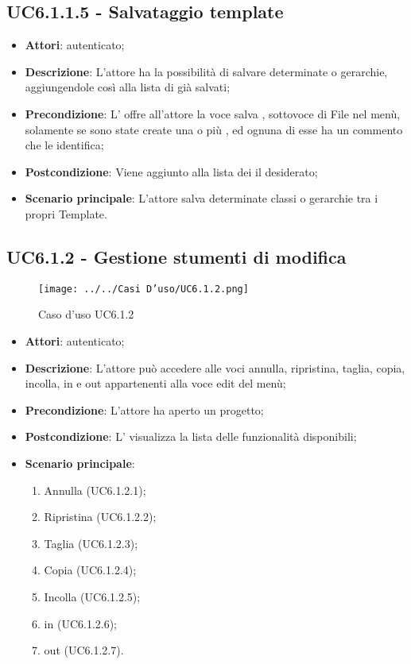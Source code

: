 \subsection{UC6.1.1.5 - Salvataggio template}
\label{ssec:UC6.1.1.5}
\begin{itemize}
\item \textbf{Attori}:  autenticato;
\item \textbf{Descrizione}: L’attore ha la possibilità di salvare determinate  o gerarchie, aggiungendole così alla lista di  già salvati;
\item \textbf{Precondizione}: L’ offre all’attore la voce salva , sottovoce di File nel menù, solamente se sono state create una o più , ed ognuna di esse ha un commento che le identifica;
\item \textbf{Postcondizione}: Viene aggiunto alla lista dei  il  desiderato;
\item \textbf{Scenario principale}: L'attore salva determinate classi o gerarchie tra i propri Template.
\end{itemize}
\newpage
\subsection{UC6.1.2 - Gestione stumenti di modifica}
\label{ssec:UC6.1.2}
\begin{figure}[h!]
\centering
\texttt{[image: ../../Casi D'uso/UC6.1.2.png]}
\caption{Caso d'uso UC6.1.2}
 \end{figure}
\begin{itemize}
\item \textbf{Attori}:  autenticato;
\item \textbf{Descrizione}: L’attore può accedere alle voci annulla, ripristina, taglia, copia, incolla,  in e  out appartenenti alla voce edit del menù;
\item \textbf{Precondizione}: L'attore ha aperto un progetto;
\item \textbf{Postcondizione}: L’ visualizza la lista delle funzionalità disponibili;
\item \textbf{Scenario principale}: \begin{enumerate}\item Annulla (UC6.1.2.1);\item Ripristina (UC6.1.2.2);\item Taglia (UC6.1.2.3);\item Copia (UC6.1.2.4);\item Incolla (UC6.1.2.5);\item {} in (UC6.1.2.6);\item {} out (UC6.1.2.7).
 \end{enumerate}
\end{itemize}
